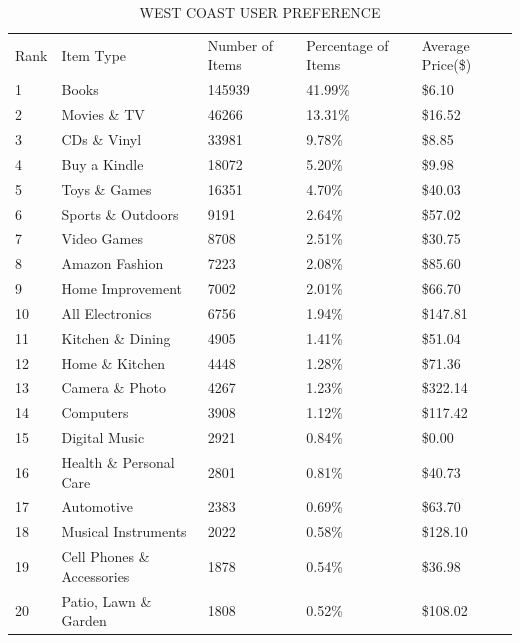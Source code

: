 \documentclass{llncs}
\begin{document}
\begin{table}[!htbp]
\caption{WEST COAST USER PREFERENCE}
\label{tb:west}
\begin{tabular}{lllll}
Rank & Item Type          & Number of Items & Percentage of Items & Average Price(\$) \\
1 & Books & 145939 & 41.99\% & \$6.10 \\
2 & Movies \& TV & 46266 & 13.31\% & \$16.52 \\
3 & CDs \& Vinyl & 33981 & 9.78\% & \$8.85 \\
4 & Buy a Kindle & 18072 & 5.20\% & \$9.98 \\
5 & Toys \& Games & 16351 & 4.70\% & \$40.03 \\
6 & Sports \& Outdoors & 9191 & 2.64\% & \$57.02 \\
7 & Video Games & 8708 & 2.51\% & \$30.75 \\
8 & Amazon Fashion & 7223 & 2.08\% & \$85.60 \\
9 & Home Improvement & 7002 & 2.01\% & \$66.70 \\
10 & All Electronics & 6756 & 1.94\% & \$147.81 \\
11 & Kitchen \& Dining & 4905 & 1.41\% & \$51.04 \\
12 & Home \& Kitchen & 4448 & 1.28\% & \$71.36 \\
13 & Camera \& Photo & 4267 & 1.23\% & \$322.14 \\
14 & Computers & 3908 & 1.12\% & \$117.42 \\
15 & Digital Music & 2921 & 0.84\% & \$0.00 \\
16 & Health \& Personal Care & 2801 & 0.81\% & \$40.73 \\
17 & Automotive & 2383 & 0.69\% & \$63.70 \\
18 & Musical Instruments & 2022 & 0.58\% & \$128.10 \\
19 & Cell Phones \& Accessories & 1878 & 0.54\% & \$36.98 \\
20 & Patio, Lawn \& Garden & 1808 & 0.52\% & \$108.02 \\
\end{tabular}
\end{table}
\end{document}
